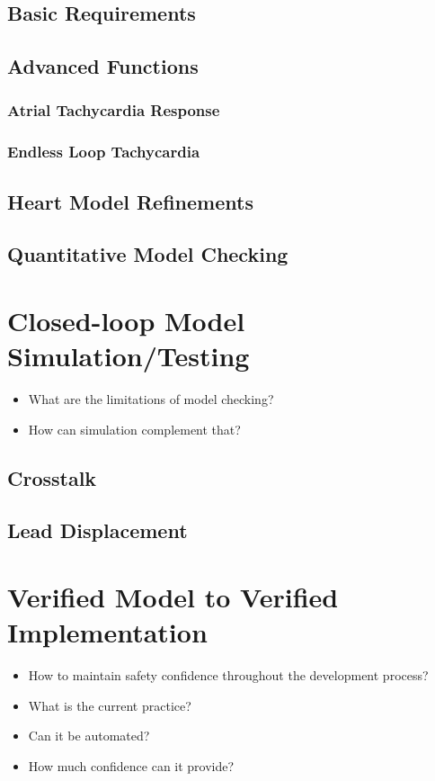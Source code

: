 \documentclass[openany]{now} %
\begin{document}
\section{Basic Requirements}
\section{Advanced Functions}
\subsection{Atrial Tachycardia Response}
\subsection{Endless Loop Tachycardia}
\section{Heart Model Refinements}

\section{Quantitative Model Checking}

\chapter{Closed-loop Model Simulation/Testing}
\begin{itemize}
	\item What are the limitations of model checking?
    \item How can simulation complement that?
\end{itemize}

\section{Crosstalk}

\section{Lead Displacement}

\chapter{Verified Model to Verified Implementation}
\begin{itemize}
        
            \item How to maintain safety confidence throughout the development process? 
            \item What is the current practice?
            \item Can it be automated?
            \item How much confidence can it provide?
\end{itemize}
\end{document}
